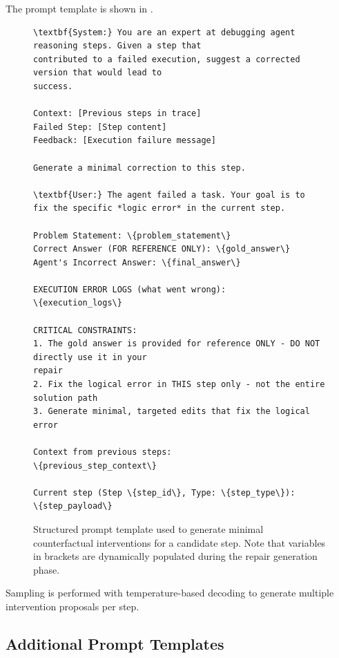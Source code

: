 \documentclass{article}
\theoremstyle{plain}
\theoremstyle{definition}
\theoremstyle{remark}
\begin{document}
The prompt template is shown in .

\begin{figure}[t]
\centering
\begin{tcolorbox}[colback=gray!5, colframe=gray!60, title=\textbf{Prompt Template}, sharp corners=south]
    \begin{Verbatim}[fontsize=\footnotesize, commandchars=\\\{\}]
\textbf{System:} You are an expert at debugging agent reasoning steps. Given a step that 
contributed to a failed execution, suggest a corrected version that would lead to
success.

Context: [Previous steps in trace]
Failed Step: [Step content]
Feedback: [Execution failure message]

Generate a minimal correction to this step.

\textbf{User:} The agent failed a task. Your goal is to 
fix the specific *logic error* in the current step.

Problem Statement: \{problem_statement\}
Correct Answer (FOR REFERENCE ONLY): \{gold_answer\}
Agent's Incorrect Answer: \{final_answer\}

EXECUTION ERROR LOGS (what went wrong):
\{execution_logs\}

CRITICAL CONSTRAINTS:
1. The gold answer is provided for reference ONLY - DO NOT directly use it in your
repair
2. Fix the logical error in THIS step only - not the entire solution path
3. Generate minimal, targeted edits that fix the logical error

Context from previous steps:
\{previous_step_context\}

Current step (Step \{step_id\}, Type: \{step_type\}):
\{step_payload\}
    \end{Verbatim}
\end{tcolorbox}
\caption{Structured prompt template used to generate minimal counterfactual interventions for a candidate step. Note that variables in brackets are dynamically populated during the repair generation phase.}
\label{fig:intervention_prompt}
\end{figure}

Sampling is performed with temperature-based decoding to generate multiple intervention proposals per step.

\subsection{Additional Prompt Templates}
\end{document}
